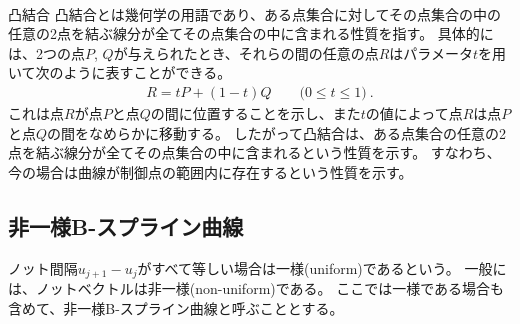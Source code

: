 ~\vfill
\begin{\Columnname}{凸結合}
凸結合とは幾何学の用語であり、ある点集合に対してその点集合の中の任意の2点を結ぶ線分が全てその点集合の中に含まれる性質を指す。
具体的には、2つの点$P$, $Q$が与えられたとき、それらの間の任意の点$R$はパラメータ$t$を用いて次のように表すことができる。
\begin{align*}
  R = tP+(1-t)Q\qquad\big(0 \leq t \leq 1\big)\ .
\end{align*}
これは点$R$が点$P$と点$Q$の間に位置することを示し、また$t$の値によって点$R$は点$P$と点$Q$の間をなめらかに移動する。
したがって凸結合は、ある点集合の任意の2点を結ぶ線分が全てその点集合の中に含まれるという性質を示す。
すなわち、今の場合は曲線が制御点の範囲内に存在するという性質を示す。
\end{\Columnname}


\clearpage
\subsection{非一様B-スプライン曲線}
ノット間隔$u_{j+1}-u_j$がすべて等しい場合は一様(uniform)であるという。
一般には、ノットベクトルは非一様(non-uniform)である。
ここでは一様である場合も含めて、非一様B-スプライン曲線と呼ぶこととする。


